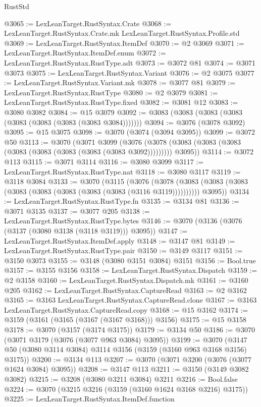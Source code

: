 \begin{lexlean}{RustStd}
\begin{coremodule}
@3065 := LexLeanTarget.RustSyntax.Crate
@3068 := LexLeanTarget.RustSyntax.Crate.mk LexLeanTarget.RustSyntax.Profile.std
@3069 := LexLeanTarget.RustSyntax.ItemDef
@3070 := @2 @3069
@3071 := LexLeanTarget.RustSyntax.ItemDef.enum
@3072 := LexLeanTarget.RustSyntax.RustType.adt
@3073 := @3072 @81
@3074 := @3071 @3073
@3075 := LexLeanTarget.RustSyntax.Variant
@3076 := @2 @3075
@3077 := LexLeanTarget.RustSyntax.Variant.mk
@3078 := @3077 @81
@3079 := LexLeanTarget.RustSyntax.RustType
@3080 := @2 @3079
@3081 := LexLeanTarget.RustSyntax.RustType.fixed
@3082 := @3081 @12
@3083 := @3080 @3082
@3084 := @15 @3079
@3092 := @3083 (@3083 (@3083 (@3083 (@3083 (@3083 (@3083 (@3083 @3084)))))))
@3094 := @3076 (@3078 @3092)
@3095 := @15 @3075
@3098 := @3070 (@3074 (@3094 @3095))
@3099 := @3072 @50
@3113 := @3070
    (@3071
      @3099
      (@3076 (@3078 (@3083 (@3083 (@3083 (@3083 (@3083 (@3083 (@3083 (@3083 @3092))))))))) @3095))
@3114 := @3072 @113
@3115 := @3071 @3114
@3116 := @3080 @3099
@3117 := LexLeanTarget.RustSyntax.RustType.nat
@3118 := @3080 @3117
@3119 := @3118 @3084
@3133 := @3070
    (@3115
      (@3076
        (@3078 (@3083 (@3083 (@3083 (@3083 (@3083 (@3083 (@3083 (@3083 (@3116 @3119))))))))))
        @3095))
@3134 := LexLeanTarget.RustSyntax.RustType.fn
@3135 := @3134 @81
@3136 := @3071 @3135
@3137 := @3077 @205
@3138 := LexLeanTarget.RustSyntax.RustType.bytes
@3146 := @3070 (@3136 (@3076 (@3137 (@3080 @3138 (@3118 @3119))) @3095))
@3147 := LexLeanTarget.RustSyntax.ItemDef.apply
@3148 := @3147 @81
@3149 := LexLeanTarget.RustSyntax.RustType.pair
@3150 := @3149 @3117
@3151 := @3150 @3073
@3155 := @3148 (@3080 @3151 @3084) @3151
@3156 := Bool.true
@3157 := @3155 @3156
@3158 := LexLeanTarget.RustSyntax.Dispatch
@3159 := @2 @3158
@3160 := LexLeanTarget.RustSyntax.Dispatch.mk
@3161 := @3160 @205
@3162 := LexLeanTarget.RustSyntax.CaptureRead
@3163 := @2 @3162
@3165 := @3163 LexLeanTarget.RustSyntax.CaptureRead.clone
@3167 := @3163 LexLeanTarget.RustSyntax.CaptureRead.copy
@3168 := @15 @3162
@3174 := @3159 (@3161 (@3165 (@3167 (@3167 @3168))) @3156)
@3175 := @15 @3158
@3178 := @3070 (@3157 (@3174 @3175))
@3179 := @3134 @50
@3186 := @3070 (@3071 @3179 (@3076 (@3077 @963 @3084) @3095))
@3199 := @3070 (@3147 @50 (@3080 @3114 @3084) @3114 @3156 (@3159 (@3160 @963 @3168 @3156) @3175))
@3200 := @3134 @113
@3207 := @3070 (@3071 @3200 (@3076 (@3077 @1624 @3084) @3095))
@3208 := @3147 @113
@3211 := @3150 (@3149 @3082 @3082)
@3215 := @3208 (@3080 @3211 @3084) @3211
@3216 := Bool.false
@3224 := @3070 (@3215 @3216 (@3159 (@3160 @1624 @3168 @3216) @3175))
@3225 := LexLeanTarget.RustSyntax.ItemDef.function

\end{coremodule}
\end{lexlean}
